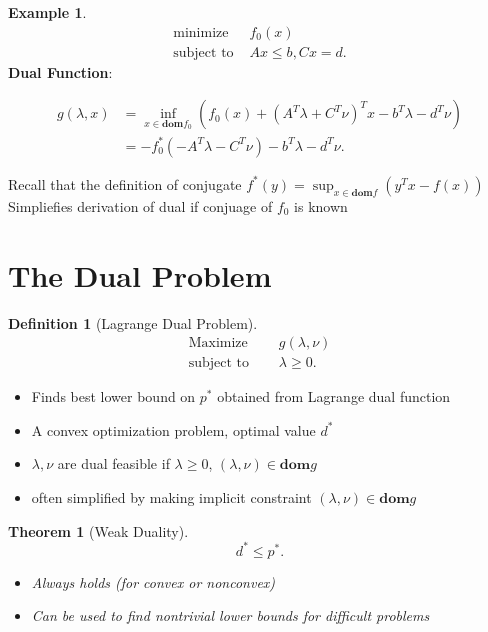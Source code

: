 \documentclass{report}
\newtheorem{theorem}{Theorem}[section]
\theoremstyle{remark} \newtheorem{remark}{Remark}[section]
\theoremstyle{definition}
\newtheorem{definition}{Definition}[section]
\theoremstyle{definition}
\newtheorem{example}{Example}[section]
\theoremstyle{definition}
\theoremstyle{remark}
\begin{document}
\begin{example}
    \begin{align*}
        \text{minimize } & f_0(x)    \\
        \text{subject to } & Ax \le  b,  Cx = d
    .\end{align*} 
\textbf{Dual Function}:

\begin{align*}
    g(\lambda,x) &= \inf_{x\in \textbf{dom}f_0}(f_0(x)+(A^{T}\lambda+C^{T}\nu)^{T}x-b^{T}\lambda-d^{T}\nu)\\
                 &= -f_0^{*}(-A^{T}\lambda-C^{T}\nu)-b^{T}\lambda-d^{T}\nu
.\end{align*}

Recall that the definition of conjugate $f^{*}(y)=\sup_{x\in\textbf{dom}f}(y^{T}x-f(x))$ \\
Simpliefies derivation of dual if conjuage of $f_0$ is known
\end{example}

\section{The Dual Problem}

\begin{definition}[Lagrange Dual Problem]
    \begin{align*}
        \text{Maximize } & \quad g(\lambda,\nu) \\
        \text{subject to } & \quad \lambda \ge 0
    .\end{align*}
       
\end{definition}

\begin{itemize}
    \item Finds best lower bound on $p^{*}$ obtained from Lagrange dual function
        \item A convex optimization problem, optimal value $d^{*}$
            \item $\lambda,\nu$ are dual feasible if $\lambda \ge 0$, $(\lambda,\nu)\in \textbf{dom}g$ 
                \item often simplified by making implicit constraint $(\lambda,\nu)\in \textbf{dom}g$
\end{itemize}

\begin{theorem}[Weak Duality]
    \[
    d^{*} \le p^{*}
    .\] 
     \begin{itemize}
         \item Always holds (for convex or nonconvex)
             \item Can be used to find nontrivial lower bounds for difficult problems

     \end{itemize}
       
\end{theorem}
\end{document}
